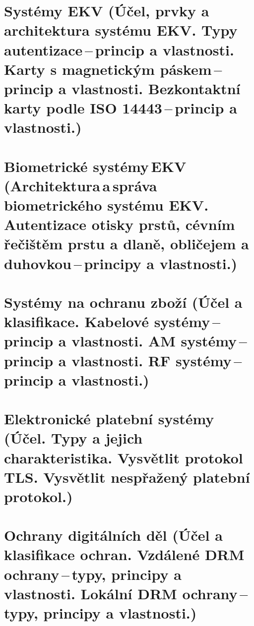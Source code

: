 

\newpage
\section{Systémy EKV (Účel, prvky a architektura systému EKV. Typy autentizace\,--\,princip a vlastnosti. Karty s magnetickým páskem\,--\,princip a vlastnosti. Bezkontaktní karty podle ISO 14443\,--\,princip a vlastnosti.)}



\newpage
\section[Biometrické systémy EKV (Architektura a správa biometrického systému EKV. Autentizace otisky prstů, cévním řečištěm prstu a dlaně, obličejem a duhovkou\,--\,principy a vlastnosti.)]{Biometrické systémy\,EKV\,(Architektura\,a\,správa biometrického systému EKV. Autentizace otisky prstů, cévním řečištěm prstu a dlaně, obličejem a duhovkou\,--\,principy a vlastnosti.)}



\newpage
\section{Systémy na ochranu zboží (Účel a klasifikace. Kabelové systémy\,--\,princip a vlastnosti. AM systémy\,--\,princip a vlastnosti. RF systémy\,--\,princip a vlastnosti.)}



\newpage
\section{Elektronické platební systémy (Účel. Typy a jejich charakteristika. Vysvětlit protokol TLS. Vysvětlit nespřažený platební protokol.)}



\newpage
\section{Ochrany digitálních děl (Účel a klasifikace ochran. Vzdálené DRM ochrany\,--\,typy, principy a vlastnosti. Lokální DRM ochrany\,--\,typy, principy a vlastnosti.)}

